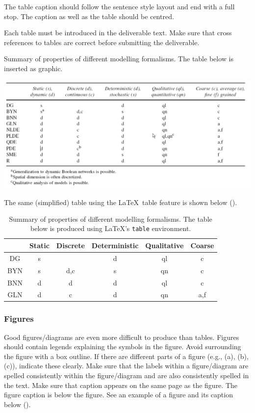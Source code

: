 The table caption should follow the sentence style layout and end with a full stop. The caption as well as the table should be centred.

Each table must be introduced in the deliverable text. Make sure that cross references to tables are correct before submitting the deliverable.

\begin{table}[htb]
	\centering
	\caption{Summary of properties of different modelling formalisms. The table below is inserted as graphic.}
	\label{tab:graphicastable}
	\includegraphics[width=1.00\linewidth]{graphics/graphicastable}
\end{table}

The same (simplified) table using the \LaTeX\ table feature is shown below ().

\begin{table}[htb]
	\centering
	\caption{Summary of properties of different modelling formalisms. The table below is produced using \LaTeX's {\tt table} environment.}
	\label{tab:latextable}
	\begin{tabular}{cccccc}
		\hline
		& Static & Discrete & Deterministic & Qualitative & Coarse \\
	    \hline
	    DG & s &  & d & ql & c \\
	    BYN & s & d,c & s & qn & c\\
	    BNN & d & d & d & ql & c\\
	    GLN & d & c & d & qn & a,f\\
		\hline
	\end{tabular}
\end{table}

\subsubsection{Figures}

Good figures/diagrams are even more difficult to produce than tables. Figures should contain legends explaining the symbols in the figure. Avoid surrounding the figure with a box outline. If there are different parts of a figure (e.g., (a), (b), (c)), indicate these clearly. Make sure that the labels within a figure/diagram are spelled consistently within the figure/diagram and are also consistently spelled in the text. Make sure that caption appears on the same page as the figure. The figure caption is below the figure. See an example of a figure and its caption below ().

